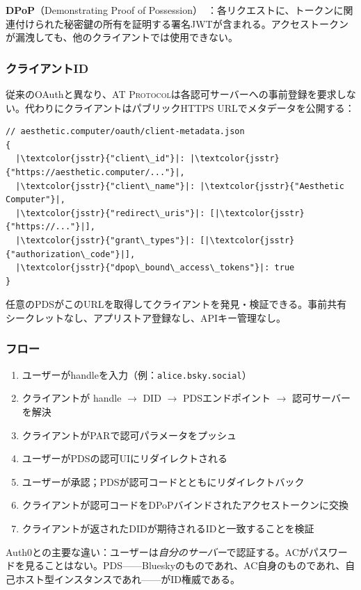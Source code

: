 \documentclass[10pt,letterpaper,twocolumn]{article}
\newcommand{\atproto}{\textsc{AT Protocol}}
\begin{document}
\textbf{DPoP}（Demonstrating Proof of Possession）~\citep{rfc9449dpop}：各リクエストに、トークンに関連付けられた秘密鍵の所有を証明する署名JWTが含まれる。アクセストークンが漏洩しても、他のクライアントでは使用できない。

\subsubsection{クライアントID}

従来のOAuthと異なり、\atproto{}は各認可サーバーへの事前登録を要求しない。代わりにクライアントはパブリックHTTPS URLでメタデータを公開する：

\begin{lstlisting}[style=acjsstyle]
// aesthetic.computer/oauth/client-metadata.json
{
  |\textcolor{jsstr}{"client\_id"}|: |\textcolor{jsstr}{"https://aesthetic.computer/..."}|,
  |\textcolor{jsstr}{"client\_name"}|: |\textcolor{jsstr}{"Aesthetic Computer"}|,
  |\textcolor{jsstr}{"redirect\_uris"}|: [|\textcolor{jsstr}{"https://..."}|],
  |\textcolor{jsstr}{"grant\_types"}|: [|\textcolor{jsstr}{"authorization\_code"}|],
  |\textcolor{jsstr}{"dpop\_bound\_access\_tokens"}|: true
}
\end{lstlisting}

任意のPDSがこのURLを取得してクライアントを発見・検証できる。事前共有シークレットなし、アプリストア登録なし、APIキー管理なし。

\subsubsection{フロー}

\begin{enumerate}
  \item ユーザーがhandleを入力（例：\texttt{alice.bsky.social}）
  \item クライアントが handle $\to$ DID $\to$ PDSエンドポイント $\to$ 認可サーバー を解決
  \item クライアントがPARで認可パラメータをプッシュ
  \item ユーザーがPDSの認可UIにリダイレクトされる
  \item ユーザーが承認；PDSが認可コードとともにリダイレクトバック
  \item クライアントが認可コードをDPoPバインドされたアクセストークンに交換
  \item クライアントが返されたDIDが期待されるIDと一致することを検証
\end{enumerate}

Auth0との主要な違い：ユーザーは\emph{自分のサーバー}で認証する。ACがパスワードを見ることはない。PDS——Blueskyのものであれ、AC自身のものであれ、自己ホスト型インスタンスであれ——がID権威である。
\end{document}
